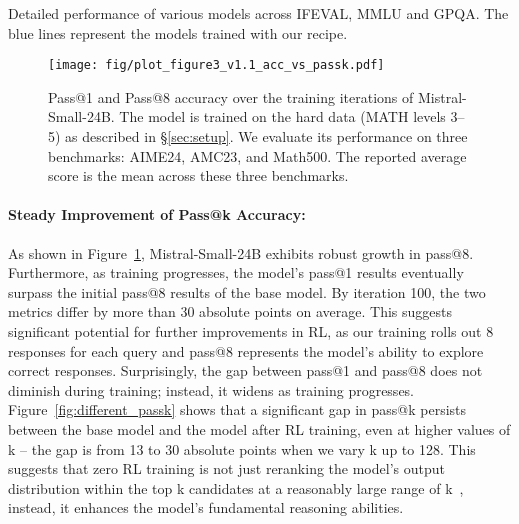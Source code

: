 \begin{table*}[t]
{}
\caption{Detailed performance of various models across IFEVAL, MMLU and GPQA. The blue lines represent the models trained with our recipe.}
\label{table:generalization_performance}
\end{table*}

\begin{figure}[!t]
        \centering
\texttt{[image: fig/plot\_figure3\_v1.1\_acc\_vs\_passk.pdf]}\vspace{-10pt}
\caption{Pass@1 and Pass@8 accuracy over the training iterations of Mistral-Small-24B. The model is trained on the hard data (MATH levels 3–5) as described in \S\ref{sec:setup}. We evaluate its performance on three benchmarks: AIME24, AMC23, and Math500. The reported average score is the mean across these three benchmarks.
        }
        \label{fig3:passk-mistral}
\end{figure}


\label{sec:lift_pass_k}
\paragraph{Steady Improvement of Pass@k Accuracy:}

As shown in Figure~\ref{fig3:passk-mistral}, Mistral-Small-24B exhibits robust growth in pass@8. Furthermore, as training progresses, the model's pass@1 results eventually surpass the initial pass@8 results of the base model. 
By iteration 100, the two metrics differ by more than 30 absolute points on average. This suggests significant potential for further improvements in RL, as our training rolls out 8 responses for each query and pass@8 represents the model's ability to explore correct responses. Surprisingly, the gap between pass@1 and pass@8 does not diminish during training; instead, it widens as training progresses. 
Figure~\ref{fig:different_passk} shows that a significant gap in pass@k persists between the base model and the model after RL training, even at higher values of k -- the gap is from 13 to 30 absolute points when we vary k up to 128. 
This suggests that zero RL training is not just reranking the model’s output distribution within the top k candidates at a reasonably large range of k~\citep{shao2024deepseekmath}, instead, it enhances the model’s fundamental reasoning abilities.

